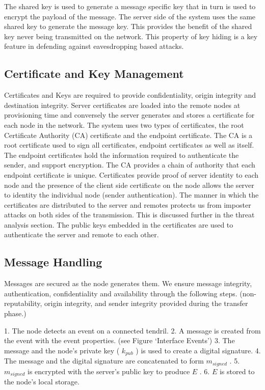 The shared key is used to generate a message specific key that in turn is used to encrypt the payload of the message. The server side of the system uses the same shared key to generate the message key. This provides the benefit of the shared key never being transmitted on the network. This property of key hiding is a key feature in defending against eavesdropping based attacks.

\subsection{Certificate and Key Management}
Certificates and Keys are required to provide confidentiality, origin integrity and destination integrity. Server certificates are loaded into the remote nodes at provisioning time and conversely the server generates and stores a certificate for each node in the network. The system uses two types of certificates, the root Certificate Authority (CA) certificate and the endpoint certificate. 
The CA is a root certificate used to sign all certificates, endpoint certificates as well as itself. The endpoint certificates hold the information required to authenticate the sender, and support encryption. The CA provides a chain of authority that each endpoint certificate is unique. 
Certificates provide proof of server identity to each node and the presence of the client side certificate on the node allows the server to identity the individual node (sender authentication). 
The manner in which the certificates are distributed to the server and remotes protects us from imposter attacks on both sides of the transmission. This is discussed further in the threat analysis section. 
  The public keys embedded in the certificates are used to authenticate the server and remote to each other. 

\subsection{Message Handling}
  Messages are secured as the node generates them. We ensure message integrity, authentication, confidentiality and availability through the following steps. (non-reputability, origin integrity, and sender integrity provided during the transfer phase.) 

  1.  The node detects an event on a connected tendril.
  2.  A message is created from the event with the event properties. (see Figure ‘Interface Events’)
  3.  The message and the node’s private key ( $k_{pub}$ ) is used to create a digital signature.
  4.  The message and the digital signature are concatenated to form $m_{signed}$ .
  5.  $m_{signed}$ is encrypted with the server’s public key to produce $E$ .
  6.  $E$  is stored to the node’s local storage.
   
